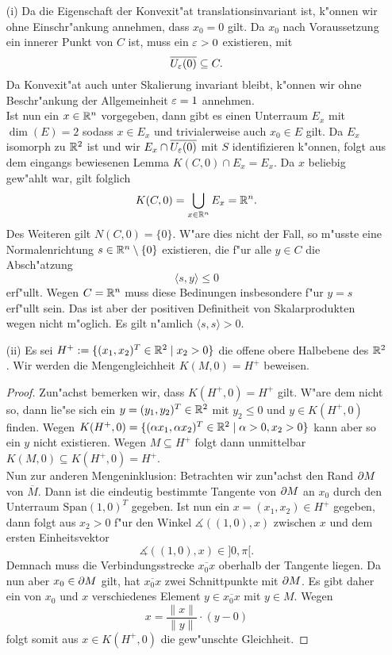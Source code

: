 \begin{itemize}
\item [(i)]
Da die Eigenschaft der Konvexit"at translationsinvariant
ist, k"onnen wir ohne Einschr"ankung annehmen, dass $x_0 = 0$ gilt. Da $x_0$
nach Voraussetzung ein innerer Punkt von $C$ ist, muss ein $\varepsilon > 0$ existieren,
mit
\[
\overline{U_\varepsilon (0)} \subseteq C.
\]
Da Konvexit"at auch unter Skalierung invariant bleibt, k"onnen wir ohne Beschr"ankung
der Allgemeinheit $\varepsilon = 1$ annehmen.\\

Ist nun ein $x\in\mathbb{R}^n$ vorgegeben, dann gibt es einen Unterraum $E_x$ mit $\dim(E)=2$
sodass $x \in E_x$ und trivialerweise auch $x_0 \in E$ gilt. Da $E_x$ isomorph zu $\mathbb{R}^2$
ist und wir $E_x \cap \overline{U_\varepsilon (0)}$ mit $S$ identifizieren k"onnen,
folgt aus dem eingangs bewiesenen Lemma $K(C,0)\cap E_x = E_x$. Da $x$ beliebig
gew"ahlt war, gilt folglich
\[
K(C,0) = \bigcup_{x\in\mathbb{R}^n} E_x = \mathbb{R}^n.
\]
Des Weiteren gilt $N(C,0) = \{0\}$. W"are dies nicht der Fall, so m"usste eine
Normalenrichtung $s\in\mathbb{R}^n\setminus\{0\}$ existieren, die f"ur alle $y\in C$ die Absch"atzung
\[
\langle s, y \rangle \le 0
\]
erf"ullt. Wegen $C = \mathbb{R}^n$ muss diese Bedinungen insbesondere f"ur $y = s$ erf"ullt
sein. Das ist aber der positiven Definitheit von Skalarprodukten wegen nicht m"oglich.
Es gilt n"amlich $\langle s,s \rangle > 0$.

\item[(ii)] Es sei $H^+ := \{(x_1, x_2)^T \in\mathbb{R}^2 \mid x_2 > 0\}$ die offene obere Halbebene
des $\mathbb{R}^2$. Wir werden die Mengengleichheit $K(M,0) = H^+$ beweisen.
\begin{proof}
Zun"achst bemerken wir, dass $K(H^+, 0) = H^+$ gilt. W"are dem nicht so, dann
lie"se sich ein $y = (y_1, y_2)^T \in \mathbb{R}^2$ mit $y_2 \le 0$ und $y\in K(H^+,0)$
finden. Wegen $K(H^+,0) = \{(\alpha x_1, \alpha x_2)^T \in \mathbb{R}^2 \mid \alpha > 0, x_2 > 0\}$ kann aber
so ein $y$ nicht existieren. Wegen $M\subseteq H^+$ folgt dann unmittelbar
$K(M, 0) \subseteq K(H^+, 0) = H^+$.\\

Nun zur anderen Mengeninklusion: Betrachten wir zun"achst den Rand $\partial{M}$
von $\overline{M}$. Dann ist die eindeutig bestimmte Tangente von $\partial{M}$ an $x_0$ durch den
Unterraum $\text{Span}{(1,0)^T}$ gegeben. Ist nun ein $x=(x_1, x_2)\in H^+$ gegeben,
dann folgt aus $x_2 > 0$ f"ur den Winkel $\measuredangle((1,0),x)$ zwischen $x$
und dem ersten Einheitsvektor
\[
\measuredangle((1,0),x) \in ]0,\pi[.
\]
Demnach
muss die Verbindungsstrecke $\overline {x_0 x}$ oberhalb der Tangente liegen.
Da nun aber $x_0 \in \partial{M}$ gilt, hat $\overline {x_0 x}$ zwei Schnittpunkte mit $\partial{M}$. Es gibt
daher ein von $x_0$ und $x$ verschiedenes Element $y \in \overline {x_0 x}$ mit
$y\in M$. Wegen
\[
x = \frac{\|x\|}{\|y\|}\cdot(y - 0)
\]
folgt somit aus $x\in K(H^+,0)$ die gew"unschte Gleichheit.
\end{proof}


\end{itemize}
